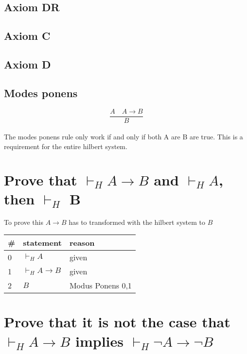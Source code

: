\documentclass{article}
\begin{document}
\subsection{Axiom DR}
\subsection{Axiom C}
\subsection{Axiom D}

\subsection{Modes ponens}

\[\frac{A \quad A\to B}{B}\] \\

The modes ponens rule only work if and only if both A are B are true.
This is a requirement for the entire hilbert system.


\section{Prove that $\vdash_H A \to B$ and $\vdash_H A$, then $\vdash_H$ B}
To prove this $A \to B$ has to transformed with the hilbert system to $B$

\begin{tabular}{@{}l|ll@{}}
\#& statement			&reason \\ \toprule
0& $\vdash_H A$ & given \\
1& $\vdash_H A \to B$ & given \\
2& $B$ & Modus Ponens 0,1 \\
\end{tabular}

\section{Prove that it is not the case that $\vdash_H A \to B$ implies 
$ \vdash_H \neg A \to \neg B$}
\end{document}
